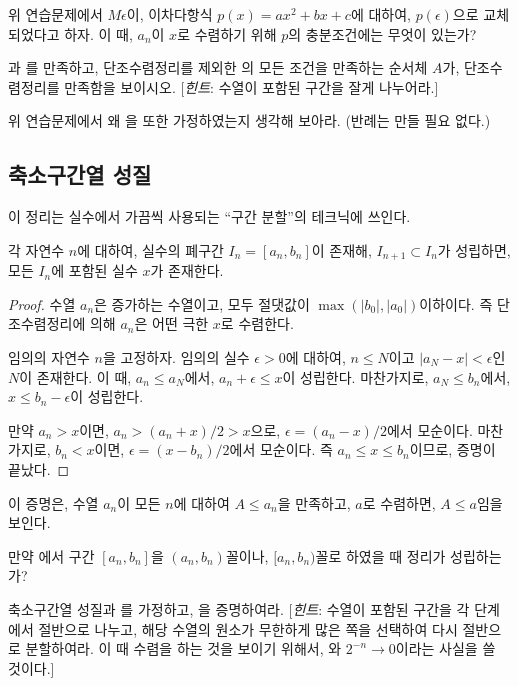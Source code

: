 \begin{exercise}
    위 연습문제에서 $M\epsilon$이, 이차다항식 $p(x) = ax^2 + bx + c$에 대하여, $p(\epsilon)$으로 교체되었다고 하자.
    이 때, $a_n$이 $x$로 수렴하기 위해 $p$의 충분조건에는 무엇이 있는가?
\end{exercise}
\begin{exercise}
    과 를 만족하고, 단조수렴정리를 제외한 의 모든 조건을 만족하는 순서체 $A$가, 단조수렴정리를 만족함을 보이시오. [\textit{힌트}: 수열이 포함된 구간을 잘게 나누어라.]
\end{exercise}
\begin{exercise}
    위 연습문제에서 왜 을 또한 가정하였는지 생각해 보아라. (반례는 만들 필요 없다.)
\end{exercise}
\subsection{축소구간열 성질}
이 정리는 실수에서 가끔씩 사용되는 ``구간 분할''의 테크닉에 쓰인다.
\begin{theorem}
\label{thm:nip}
    각 자연수 $n$에 대하여, 실수의 폐구간 $I_n = [a_n, b_n]$이 존재해, $I_{n + 1} \subset I_n$가 성립하면, 모든 $I_n$에 포함된 실수 $x$가 존재한다.
\end{theorem}
\begin{proof}
    수열 $a_n$은 증가하는 수열이고, 모두 절댓값이 $\max(|b_0|, |a_0|)$이하이다.
    즉 단조수렴정리에 의해 $a_n$은 어떤 극한 $x$로 수렴한다.

    임의의 자연수 $n$을 고정하자.
    임의의 실수 $\epsilon > 0$에 대하여, $n \leq N$이고 $|a_N - x| < \epsilon$인 $N$이 존재한다.
    이 때, $a_n \leq a_N$에서, $a_n + \epsilon \leq x$이 성립한다.
    마찬가지로, $a_N \leq b_n$에서, $x \leq b_n - \epsilon$이 성립한다.

    만약 $a_n > x$이면, $a_n > (a_n + x)/2 > x$으로, $\epsilon = (a_n - x)/2$에서 모순이다.
    마찬가지로, $b_n < x$이면, $\epsilon = (x - b_n)/2$에서 모순이다.
    즉 $a_n \leq x \leq b_n$이므로, 증명이 끝났다.
\end{proof}
\begin{remark}
    이 증명은, 수열 $a_n$이 모든 $n$에 대하여 $A \leq a_n$을 만족하고, $a$로 수렴하면, $A \leq a$임을 보인다.
\end{remark}
\begin{exercise}
    만약 에서 구간 $[a_n, b_n]$을 $(a_n, b_n)$꼴이나, $[a_n, b_n)$꼴로 하였을 때 정리가 성립하는가?
\end{exercise}
\begin{exercise}
\label{exer:niptobolz}
    축소구간열 성질과 를 가정하고, 을 증명하여라.
    [\textit{힌트}: 수열이 포함된 구간을 각 단계에서 절반으로 나누고, 해당 수열의 원소가 무한하게 많은 쪽을 선택하여 다시 절반으로 분할하여라. 이 때 수렴을 하는 것을 보이기 위해서, 와 $2^{-n} \to 0$이라는 사실을 쓸 것이다.]
\end{exercise}

